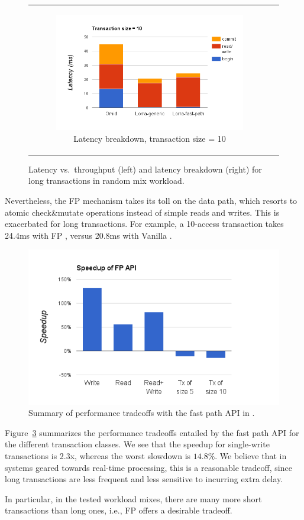 \begin{figure}[t]
\begin{tabular}{cc}
  \begin{subfigure}[t]{0.5\textwidth}
	\includegraphics[width=.9\textwidth]{figs/stack-tx10.png}
	\caption[]{Latency breakdown, transaction size = 10}
    \label{fig:stack-tx10}
  \end{subfigure} 
\end{tabular}  			
  \caption{Latency vs.\ throughput (left) and latency breakdown (right) for long transactions in random mix workload. }
  \label{fig:throughput-latency}
\end{figure}


Nevertheless,
the FP mechanism takes its toll on the data path, which resorts to atomic check\&mutate operations 
instead of simple reads and writes. This is exacerbated for long transactions. 
For example, a 10-access transaction takes 24.4ms with FP \sys, 
versus 20.8ms with Vanilla \sys. 

\begin{figure}[tbh]
\centering
\includegraphics[width=.4\textwidth]{figs/speedup.png}
\caption{Summary of performance tradeoffs with the fast path API in {\sys}.}
\label{fig:fp-tradeoff}
\end{figure}



Figure~\ref{fig:fp-tradeoff} summarizes the performance tradeoffs entailed by the fast path API
for the different transaction classes. 
We see that the speedup for single-write transactions is 2.3x, whereas the worst slowdown is $14.8\%$. 
We believe that in systems geared towards real-time processing, this is a reasonable tradeoff, since long transactions 
are less frequent and less sensitive to incurring extra delay.

In particular, in the tested workload mixes, there are many more short transactions than long ones, 
i.e., FP \sys\/ offers a desirable tradeoff. 

